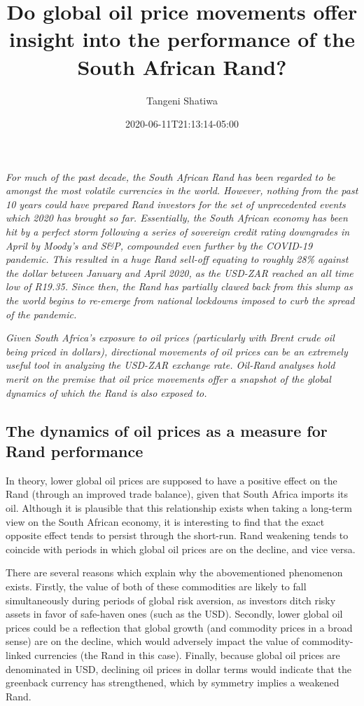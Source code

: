 \documentclass[
]{article}
\title{Do global oil price movements offer insight into the performance of the
South African Rand?}
\author{Tangeni Shatiwa}
\date{2020-06-11T21:13:14-05:00}
\begin{document}
\maketitle

\emph{For much of the past decade, the South African Rand has been
regarded to be amongst the most volatile currencies in the world.
However, nothing from the past 10 years could have prepared Rand
investors for the set of unprecedented events which 2020 has brought so
far. Essentially, the South African economy has been hit by a perfect
storm following a series of sovereign credit rating downgrades in April
by Moody's and S\&P, compounded even further by the COVID-19 pandemic.
This resulted in a huge Rand sell-off equating to roughly 28\% against
the dollar between January and April 2020, as the USD-ZAR reached an all
time low of R19.35. Since then, the Rand has partially clawed back from
this slump as the world begins to re-emerge from national lockdowns
imposed to curb the spread of the pandemic.}

\emph{Given South Africa's exposure to oil prices (particularly with
Brent crude oil being priced in dollars), directional movements of oil
prices can be an extremely useful tool in analyzing the USD-ZAR exchange
rate. Oil-Rand analyses hold merit on the premise that oil price
movements offer a snapshot of the global dynamics of which the Rand is
also exposed to.}

\hypertarget{the-dynamics-of-oil-prices-as-a-measure-for-rand-performance}{%
\subsection{The dynamics of oil prices as a measure for Rand
performance}\label{the-dynamics-of-oil-prices-as-a-measure-for-rand-performance}}

In theory, lower global oil prices are supposed to have a positive
effect on the Rand (through an improved trade balance), given that South
Africa imports its oil. Although it is plausible that this relationship
exists when taking a long-term view on the South African economy, it is
interesting to find that the exact opposite effect tends to persist
through the short-run. Rand weakening tends to coincide with periods in
which global oil prices are on the decline, and vice versa.

There are several reasons which explain why the abovementioned
phenomenon exists. Firstly, the value of both of these commodities are
likely to fall simultaneously during periods of global risk aversion, as
investors ditch risky assets in favor of safe-haven ones (such as the
USD). Secondly, lower global oil prices could be a reflection that
global growth (and commodity prices in a broad sense) are on the
decline, which would adversely impact the value of commodity-linked
currencies (the Rand in this case). Finally, because global oil prices
are denominated in USD, declining oil prices in dollar terms would
indicate that the greenback currency has strengthened, which by symmetry
implies a weakened Rand.
\end{document}
